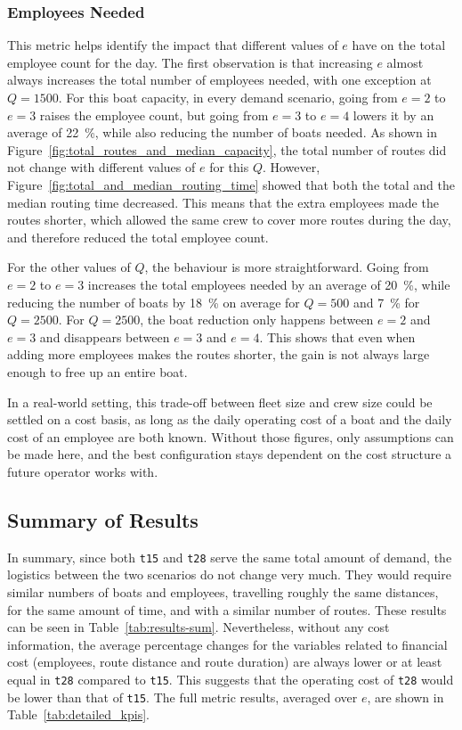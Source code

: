 \documentclass[12pt]{article}
\begin{document}
\subsubsection{Employees Needed}
\label{subsubsec:employees-needed}

This metric helps identify the impact that different values of \(e\) have on the total employee count for the day. The first observation is that increasing \(e\) almost always increases the total number of employees needed, with one exception at \(Q=1500\). For this boat capacity, in every demand scenario, going from \(e=2\) to \(e=3\) raises the employee count, but going from \(e=3\) to \(e=4\) lowers it by an average of \qty{22}{\percent}, while also reducing the number of boats needed. As shown in Figure~\ref{fig:total_routes_and_median_capacity}, the total number of routes did not change with different values of \(e\) for this \(Q\). However, Figure~\ref{fig:total_and_median_routing_time} showed that both the total and the median routing time decreased. This means that the extra employees made the routes shorter, which allowed the same crew to cover more routes during the day, and therefore reduced the total employee count.

For the other values of \(Q\), the behaviour is more straightforward. Going from \(e=2\) to \(e=3\) increases the total employees needed by an average of \qty{20}{\percent}, while reducing the number of boats by \qty{18}{\percent} on average for \(Q=500\) and \qty{7}{\percent} for \(Q=2500\). For \(Q=2500\), the boat reduction only happens between \(e=2\) and \(e=3\) and disappears between \(e=3\) and \(e=4\). This shows that even when adding more employees makes the routes shorter, the gain is not always large enough to free up an entire boat.

In a real-world setting, this trade-off between fleet size and crew size could be settled on a cost basis, as long as the daily operating cost of a boat and the daily cost of an employee are both known. Without those figures, only assumptions can be made here, and the best configuration stays dependent on the cost structure a future operator works with.

\subsection{Summary of Results}
\label{subsec:results-summary}

In summary, since both \texttt{t15} and \texttt{t28} serve the same total amount of demand, the logistics between the two scenarios do not change very much. They would require similar numbers of boats and employees, travelling roughly the same distances, for the same amount of time, and with a similar number of routes. These results can be seen in Table~\ref{tab:results-sum}. Nevertheless, without any cost information, the average percentage changes for the variables related to financial cost (employees, route distance and route duration) are always lower or at least equal in \texttt{t28} compared to \texttt{t15}. This suggests that the operating cost of \texttt{t28} would be lower than that of \texttt{t15}. The full metric results, averaged over \(e\), are shown in Table~\ref{tab:detailed_kpis}.
\end{document}
